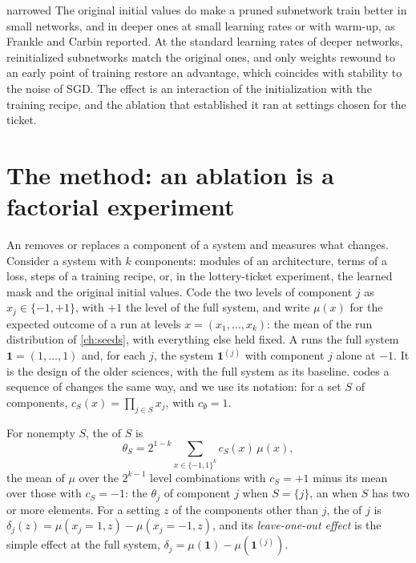 \begin{refsection}
\begin{verdict}{narrowed}
The original initial values do make a pruned subnetwork train better in small networks, and in deeper ones at small learning rates or with warm-up, as Frankle and Carbin reported. At the standard learning rates of deeper networks, reinitialized subnetworks match the original ones, and only weights rewound to an early point of training restore an advantage, which coincides with stability to the noise of SGD. The effect is an interaction of the initialization with the training recipe, and the ablation that established it ran at settings chosen for the ticket.
\end{verdict}

\section{The method: an ablation is a factorial experiment}\label{sec:ablations:factorial}

An  removes or replaces a component of a system and measures what changes. Consider a system with $k$ components: modules of an architecture, terms of a loss, steps of a training recipe, or, in the lottery-ticket experiment, the learned mask and the original initial values. Code the two levels of component $j$ as $x_j\in\{-1,+1\}$, with $+1$ the level of the full system, and write $\mu(x)$ for the expected outcome of a run at levels $x=(x_1,\dots,x_k)$: the mean of the run distribution of \cref{ch:seeds}, with everything else held fixed. A  runs the full system $\mathbf 1=(1,\dots,1)$ and, for each $j$, the system $\mathbf 1^{(j)}$ with component $j$ alone at $-1$. It is the  design of the older sciences, with the full system as its baseline.  codes a sequence of changes the same way, and we use its notation: for a set $S$ of components, $c_S(x)=\prod_{j\in S}x_j$, with $c_\emptyset=1$.

\begin{definition}\label{def:ablations:effects}
For nonempty $S$, the  of $S$ is
\[
\theta_S=2^{1-k}\sum_{x\in\{-1,1\}^k}c_S(x)\,\mu(x),
\]
the mean of $\mu$ over the $2^{k-1}$ level combinations with $c_S=+1$ minus its mean over those with $c_S=-1$: the  $\theta_j$ of component $j$ when $S=\{j\}$, an  when $S$ has two or more elements. For a setting $z$ of the components other than $j$, the  of $j$ is $\delta_j(z)=\mu(x_j{=}1,z)-\mu(x_j{=}{-1},z)$, and its \emph{leave-one-out effect} is the simple effect at the full system, $\delta_j=\mu(\mathbf 1)-\mu(\mathbf 1^{(j)})$.
\end{definition}


\end{refsection}
